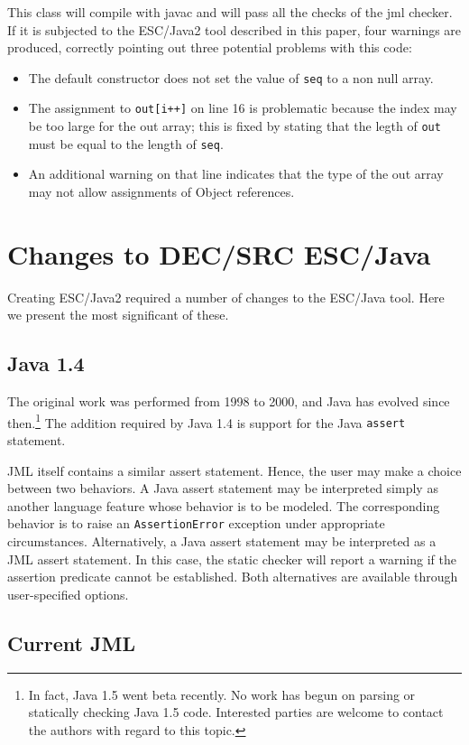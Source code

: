 \documentclass{llncs}
\begin{document}
This class will compile with javac and will pass all the checks of the jml checker.  If it is subjected to the ESC/Java2 tool described in this paper, four warnings are produced, correctly pointing out three potential problems with this code:
\begin{itemize}
\item The default constructor does not set the value of \texttt{seq} to a non null array.
\item The assignment to \texttt{out[i++]} on line 16 is problematic because the index may be too large for the out array; this is fixed by stating that the legth of \texttt{out} must be equal to the length of \texttt{seq}.
\item An additional warning on that line indicates that the type of the out array may not allow
assignments of Object references.
\end{itemize} 
\section{Changes to DEC/SRC ESC/Java}

Creating ESC/Java2 required a number of changes to the ESC/Java tool.
Here we present the most significant of these.

\subsection{Java 1.4}

The original work was performed from 1998 to 2000, and Java has
evolved since then.\footnote{In fact, Java 1.5 went beta recently.  No
  work has begun on parsing or statically checking Java 1.5 code.
  Interested parties are welcome to contact the authors with regard to
  this topic.}  The addition required by Java 1.4 is support for the
Java {\tt assert} statement.

JML itself contains a similar assert statement.  Hence, the user may
make a choice between two behaviors.  A Java assert statement may be
interpreted simply as another language feature whose behavior is to be
modeled.  The corresponding behavior is to raise an
\texttt{AssertionError} exception under appropriate circumstances.
Alternatively, a Java assert statement may be interpreted as a JML
assert statement.  In this case, the static checker will report a
warning if the assertion predicate cannot be established.  Both
alternatives are available through user-specified options.

\subsection{Current JML}
\end{document}

